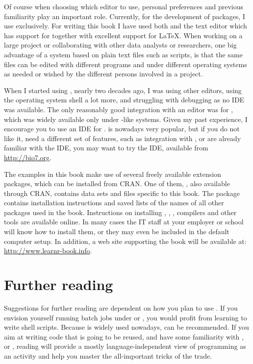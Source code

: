 \documentclass[krantz2]{krantz}\usepackage{knitr}
\begin{document}
Of course when choosing which editor to use, personal preferences and previous familiarity play an important role.
Currently, for the development of packages, I use \RStudio exclusively. For writing this book I have used both \RStudio and the text editor  which has support for \Rpgrm together with excellent support for \LaTeX{}. When working on a large project or collaborating with other data analysts or researchers, one big advantage of a system based on plain text files such as \Rlang scripts, is that the same files can be edited with different programs and under different operating systems as needed or wished by the different persons involved in a project.

When I started using \Rpgrm, nearly two decades ago, I was using other editors, using the operating system shell a lot more, and struggling with debugging as no IDE was available. The only reasonably good integration with an editor was for , which was widely available only under -like systems. Given my past experience, I encourage you to use an IDE for \Rpgrm. \RStudio is nowadays very popular, but if you do not like it, need a different set of features, such as integration with , or are already familiar with the  IDE, you may want to try the  IDE, available from \url{http://bio7.org}.

The examples in this book make use of several freely available \Rlang extension packages, which can be installed from CRAN. One of them, , also available through CRAN, contains data sets and files specific to this book. The  package contains installation instructions and saved lists of the names of all other packages used in the book. Instructions on installing \Rpgrm, , \RStudio, compilers and other tools are available online. In many cases the IT staff at your employer or school will know how to install them, or they may even be included in the default computer setup. In addition, a web site supporting the book will be available at: \url{http://www.learnr-book.info}.

\section{Further reading}
Suggestions for further reading are dependent on how you plan to use \Rlang. If you envision yourself running batch jobs under  or , you would profit from learning to write shell scripts. Because  is widely used nowadays,  \autocite{Newham2005} can be recommended. If you aim at writing \Rlang code that is going to be reused, and have some familiarity with \Clang, \Cpplang or \javalang, reading  \autocite{Kernighan1999} will provide a mostly language-independent view of programming as an activity and help you master the all-important tricks of the trade.
\end{document}
